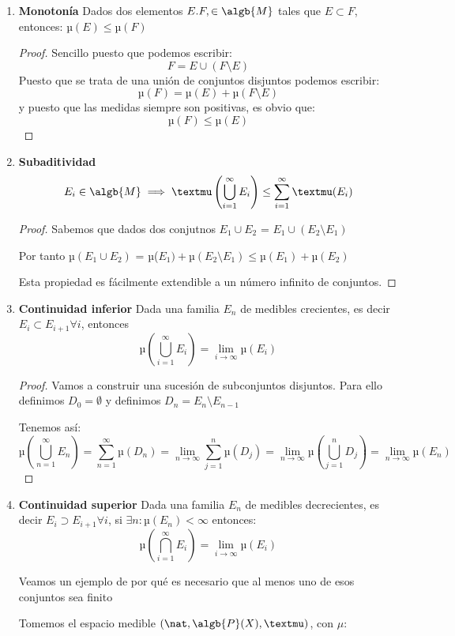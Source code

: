\documentclass{apuntes}
\begin{document}
\begin{enumerate}
\item \textbf{Monotonía} Dados dos elementos $E. F, \in \algb{M}$ tales que $E\subset F$, entonces: $µ(E)\leq µ(F)$
\begin{proof}
Sencillo puesto que podemos escribir:
\[F=E\cup(F \setminus E)\]
Puesto que se trata de una unión de conjuntos disjuntos podemos escribir:
\[µ(F)=µ(E)+µ(F\setminus E)\]
y puesto que las medidas siempre son positivas, es obvio que:
\[µ(F) \leq µ(E)\]
\end{proof}

\item \textbf{Subaditividad}
\[E_i \in \algb{M} \implies µ\left(\bigcup_{i=1}^{\infty}E_i\right)\leq \sum_{i=1}^{\infty}µ(E_i)\]

\begin{proof}
Sabemos que dados dos conjutnos $E_1 \cup E_2 $ = $E_1 \cup (E_2 \setminus E_1)$

Por tanto  $µ(E_1 \cup E_2) $ = µ($E_1) + µ(E_2 \setminus E_1) \leq µ(E_1)+µ(E_2)$

Esta propiedad es fácilmente extendible a un número infinito de conjuntos.
\end{proof}

\item \textbf{Continuidad inferior} Dada una familia $E_n$ de medibles crecientes, es decir $E_{i}\subset E_{i+1} \forall i$, entonces
\[µ(\bigcup_{i=1}^{\infty}E_i)=\lim_{i \to \infty} µ(E_i)\]

\begin{proof}
Vamos a construir una sucesión de subconjuntos disjuntos. Para ello definimos $D_0=\emptyset$ y definimos $D_n=E_n \setminus E_{n-1}$

Tenemos así:
\[µ(\bigcup_{n=1}^{\infty}E_n)=\sum_{n=1}^{\infty}µ(D_n)=\lim_{n \to \infty}
\sum_{j=1}^{n}µ(D_j)=\lim_{n \to \infty}µ(\bigcup_{j=1}^{n}D_j) = \lim_{n \to \infty}µ(E_n)\]
\end{proof}

\item \textbf{Continuidad superior} Dada una familia $E_n$ de medibles decrecientes, es decir $E_{i}\supset E_{i+1} \forall i$, si $\exists n: µ(E_n)< \infty$ entonces:
\[µ(\bigcap_{i=1}^{\infty}E_i)=\lim_{i \to \infty} µ(E_i)\]

Veamos un ejemplo de por qué es necesario que al menos uno de esos conjuntos sea finito
\begin{example}
Tomemos el espacio medible $(\nat, \algb{P}(X), µ)$, con $μ$:


\end{example}
\end{enumerate}
\end{document}
